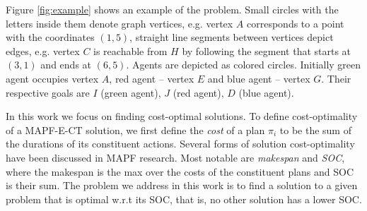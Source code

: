Figure \ref{fig:example} shows an example of the problem. Small circles with the letters inside them denote graph vertices, e.g. vertex $A$ corresponds to a point with the coordinates $(1, 5)$, straight line segments between vertices depict edges, e.g. vertex $C$ is reachable from $H$ by following the segment that starts at $(3, 1)$ and ends at $(6,5)$. Agents are depicted as colored circles. Initially green agent occupies vertex $A$, red agent -- vertex $E$ and blue agent -- vertex $G$. Their respective goals are $I$ (green agent), $J$ (red agent), $D$ (blue agent).


In this work we focus on finding cost-optimal solutions. 
To define cost-optimality of a MAPF-E-CT solution, we first define the \emph{cost} of a plan $\pi_i$ to be the sum of the durations of its constituent actions. 
Several forms of solution cost-optimality have been discussed in \ac{MAPF} research. Most notable are \emph{makespan} and \emph{\ac{SOC}}, where the makespan is the max over the costs of the constituent plans and \ac{SOC} is their sum. The problem we address in this work is to find a solution to a given problem 
that is optimal w.r.t its \ac{SOC}, that is, no other solution has a lower \ac{SOC}. 



    
